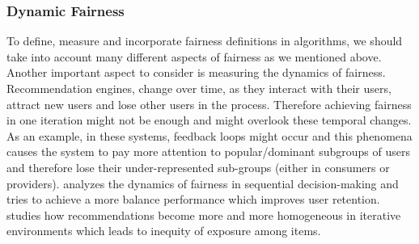 


\subsubsection{Dynamic Fairness}  
To define, measure and incorporate fairness definitions in algorithms, we should take into account many different aspects of fairness as we mentioned above. Another important aspect to consider is measuring the dynamics of fairness. Recommendation engines, change over time, as they interact with their users, attract new users and lose other users in the process. Therefore achieving fairness in one iteration might not be enough and might overlook these temporal changes.
As an example, in these systems, feedback loops might occur and this phenomena causes the system to pay more attention to popular/dominant subgroups of users \cite{hashimoto2018fairness} and therefore lose their under-represented sub-groups (either in consumers or providers). \cite{zhang2019group} analyzes the dynamics of fairness in sequential decision-making and tries to achieve a more balance performance which improves user retention. \cite{Chaney2018} studies how recommendations become more and more homogeneous in iterative environments which leads to inequity of exposure among items. 
    
